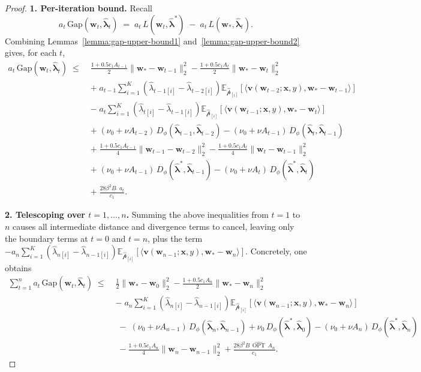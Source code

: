 \documentclass[11pt]{article}
\numberwithin{thm}{section}
\theoremstyle{plain}
\theoremstyle{definition}
\theoremstyle{remark} \newtheorem{remark}[thm]{Remark}
\def\vlambda{{\bm{\lambda}}}
\def\vv{{\bm{v}}}
\def\vw{{\bm{w}}}
\def\vx{{\bm{x}}}
\def\ep{\widehat{\mathcal{p}}}
\newcommand{\E}{\mathbb{E}}
\newcommand{\innp}[1]{\langle #1 \rangle}
\newcommand{\Gap}{\mathrm{Gap}}
\newcommand{\epi}{\ep_{[i]}}
\newcommand{\elambda}{\widehat{\lambda}}
\newcommand{\evlambda}{\widehat{\vlambda}}
\DeclareMathOperator{\OPT}{OPT}
\DeclareMathOperator{\mOPT}{OPT_m}
\newcommand{\OPThat}{\widehat{\OPT}}
\newcommand{\mOPThat}{\widehat{\mOPT}}
\begin{document}
\begin{proof}
	\textbf{1. Per-iteration bound.}
	Recall
	\[
	a_t\,\Gap(\vw_t,\evlambda_t)
	\;=\;a_t\,L(\vw_t,\evlambda^*)
	\;-\;a_t\,L(\vw_*,\evlambda_t).
	\]
	Combining Lemmas~\ref{lemma:gap-upper-bound1} and~\ref{lemma:gap-upper-bound2} gives, for each \(t\),
	\begin{align*}
		a_t\,\Gap(\vw_t,\evlambda_t)\;\le\;&
		\frac{1+0.5c_1A_{t-1}}{2}\|\vw_*-\vw_{t-1}\|_2^2
		-\frac{1+0.5c_1A_t}{2}\|\vw_*-\vw_t\|_2^2\\
		&+ \; a_{t-1}\sum_{i=1}^K(\elambda_{t-1[i]}-\elambda_{t-2[i]})\E_{\epi}[\innp{\vv(\vw_{t-2};\vx,y), \vw_*-\vw_{t-1}}] \\
        &- \; a_t\sum_{i=1}^K(\elambda_{t[i]}-\elambda_{t-1[i]})\E_{\epi}[\innp{\vv(\vw_{t-1};\vx,y), \vw_*-\vw_t}] \\ 
		&+\;(\nu_0+\nu A_{t-2})\,D_{\phi}(\evlambda_{t-1},\evlambda_{t-2})
		-(\nu_0+\nu A_{t-1})\,D_{\phi}(\evlambda_t,\evlambda_{t-1})\\
        &+\;\frac{1+0.5c_1A_{t-1}}{4}\|\vw_{t-1}-\vw_{t-2}\|_2^2-\frac{1+0.5c_1A_t}{4}\|\vw_t-\vw_{t-1}\|_2^2\\
		&+\;(\nu_0+\nu A_{t-1})\,D_{\phi}(\evlambda^*,\evlambda_{t-1})
		-(\nu_0+\nu A_t)\,D_{\phi}(\evlambda^*,\evlambda_t)\\
		&+\;\frac{28\beta^2B\mOPThat a_t}{c_1}.
	\end{align*}
	
	\textbf{2. Telescoping over \(t=1,\dots,n\).}
	Summing the above inequalities from \(t=1\) to \(n\) causes all intermediate distance and divergence terms to cancel, leaving only the boundary terms at \(t=0\) and \(t=n\), plus the term \(-a_n\sum_{i=1}^K(\elambda_{n[i]}-\elambda_{n-1[i]})\E_{\epi}[\innp{\vv(\vw_{n-1};\vx,y), \vw_*-\vw_n}]\).
    Concretely, one obtains
	\begin{align*}
		\sum_{t=1}^n a_t\,\Gap(\vw_t,\evlambda_t)\;\le\;&
		\frac12\|\vw_*-\vw_0\|_2^2
		-\frac{1+0.5c_1A_n}{2}\|\vw_*-\vw_n\|_2^2\\
		&- \; a_n\sum_{i=1}^K(\elambda_{n[i]}-\elambda_{n-1[i]})\E_{\epi}[\innp{\vv(\vw_{n-1};\vx,y), \vw_*-\vw_n}] \\ 
		&\;-\;(\nu_0+\nu A_{n-1})\,D_{\phi}(\evlambda_n,\evlambda_{n-1})
		+\nu_0\,D_{\phi}(\evlambda^*,\evlambda_0)
		-(\nu_0+\nu A_n)\,D_{\phi}(\evlambda^*,\evlambda_n)\\
		&\; -\frac{1+0.5c_1A_n}{4}\|\vw_n-\vw_{n-1}\|_2^2+\frac{28\beta^2B\,\OPThat\,A_n}{c_1}.
	\end{align*}
	

\end{proof}
\end{document}
